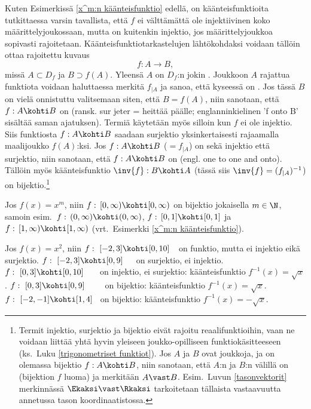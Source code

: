 Kuten Esimerkissä \ref{x^m:n käänteisfunktio} edellä, on käänteisfunktioita tutkittaessa varsin 
tavallista, että $f$ ei välttämättä ole injektiivinen koko määrittelyjoukossaan, mutta on 
kuitenkin injektio, jos määrittelyjoukkoa sopivasti rajoitetaan. Käänteisfunktiotarkastelujen 
lähtökohdaksi voidaan tällöin ottaa rajoitettu kuvaus
\[
f:A\rightarrow B,
\]
missä $A\subset D_f$ ja $B \supset f(A)$. Yleensä $A$ on $D_f$:n jokin . Joukkoon
$A$ rajattua funktiota voidaan haluttaessa merkitä $f_{|A}$ ja sanoa, että kyseessä on 
%
. Jos tässä $B$ on vielä onnistuttu valitsemaan siten, että
$B=f(A)$, niin sanotaan, että $f:A \kohti B$ on  (ransk. sur jeter = 
heittää päälle; englanninkielinen 'f onto B' sisältää saman ajatuksen). Termiä käytetään myös
silloin kun $f$ ei ole injektio. Siis funktiosta $f: A \kohti B$ saadaan surjektio
yksinkertaisesti rajaamalla maalijoukko $f(A)$:ksi. Jos $f:A \kohti B$ ($=f_{|A}$) on sekä
injektio että surjektio, niin sanotaan, että $f:A \kohti B$ on  (engl. one to one
and onto). Tällöin myös käänteisfunktio $\inv{f}:B \kohti A$ (tässä siis 
$\inv{f} = (f_{|A})^{-1}$) on bijektio.\footnote[2]{Termit injektio, surjektio ja bijektio eivät
rajoitu reaalifunktioihin, vaan ne voidaan liittää yhtä hyvin yleiseen joukko-opilliseen
funktiokäsitteeseen (ks.\ Luku \ref{trigonometriset funktiot}). Jos $A$ ja $B$ ovat joukkoja,
ja on olemassa bijektio $f:A \kohti B$, niin sanotaan, että $A$:n ja $B$:n välillä on
(bijektion $f$ luoma)  ja merkitään $A \vast B$.
Esim.\ Luvun \ref{tasonvektorit} merkinnässä $\Ekaksi\vast\Rkaksi$ tarkoitetaan tällaista
vastaavuutta annetussa tason koordinaatistossa.
} 
\begin{Exa} Jos $f(x)=x^m$, niin $f:\,[0,\infty)\kohti[0,\infty)$ on bijektio jokaisella
$m\in\N$, samoin esim.\ $f:\,(0,\infty)\kohti(0,\infty)$, $f:\,[0,1]\kohti[0,1]$ ja
$f:\,[1,\infty)\kohti[1,\infty)$ (vrt.\ Esimerkki \ref{x^m:n käänteisfunktio}). \loppu
\end{Exa} 
\begin{Exa} Jos $f(x)=x^2$, niin \vspace{2mm}\newline
$f:\ [-2,3]\kohti[0,10]\ \ $     on funktio, mutta ei injektio eikä surjektio. \newline
$f:\ [-2,3]\kohti[0,9]\quad\,$   on surjektio, ei injektio. \newline
$f:\ [0,3]\kohti[0,10]\quad\,\ $ on injektio, ei surjektio: käänteisfunktio
     $f^{-1}(x)=\sqrt{x}$. 
\newline
$f:\ [0,3]\kohti[0,9]\qquad$     on bijektio: käänteisfunktio $f^{-1}(x)=\sqrt{x}$. \newline
$f:\ [-2,-1]\kohti[1,4]\,\ $     on bijektio: käänteisfunktio $f^{-1}(x)=-\sqrt{x}$. \loppu
\end{Exa}

